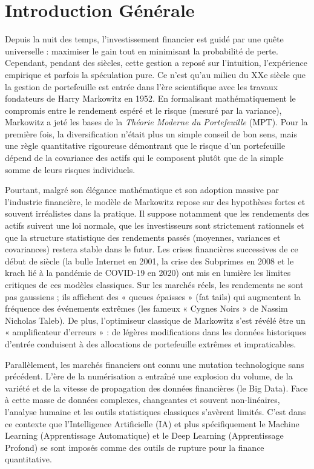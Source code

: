\chapter*{Introduction Générale}

Depuis la nuit des temps, l'investissement financier est guidé par une quête universelle : maximiser le gain tout en minimisant la probabilité de perte. Cependant, pendant des siècles, cette gestion a reposé sur l'intuition, l'expérience empirique et parfois la spéculation pure. Ce n'est qu'au milieu du XXe siècle que la gestion de portefeuille est entrée dans l'ère scientifique avec les travaux fondateurs de Harry Markowitz en 1952. En formalisant mathématiquement le compromis entre le rendement espéré et le risque (mesuré par la variance), Markowitz a jeté les bases de la \textit{Théorie Moderne du Portefeuille} (MPT). Pour la première fois, la diversification n'était plus un simple conseil de bon sens, mais une règle quantitative rigoureuse démontrant que le risque d'un portefeuille dépend de la covariance des actifs qui le composent plutôt que de la simple somme de leurs risques individuels.

Pourtant, malgré son élégance mathématique et son adoption massive par l'industrie financière, le modèle de Markowitz repose sur des hypothèses fortes et souvent irréalistes dans la pratique. Il suppose notamment que les rendements des actifs suivent une loi normale, que les investisseurs sont strictement rationnels et que la structure statistique des rendements passés (moyennes, variances et covariances) restera stable dans le futur. Les crises financières successives de ce début de siècle (la bulle Internet en 2001, la crise des Subprimes en 2008 et le krach lié à la pandémie de COVID-19 en 2020) ont mis en lumière les limites critiques de ces modèles classiques. Sur les marchés réels, les rendements ne sont pas gaussiens ; ils affichent des « queues épaisses » (fat tails) qui augmentent la fréquence des événements extrêmes (les fameux « Cygnes Noirs » de Nassim Nicholas Taleb). De plus, l'optimiseur classique de Markowitz s'est révélé être un « amplificateur d'erreurs » : de légères modifications dans les données historiques d'entrée conduisent à des allocations de portefeuille extrêmes et impraticables.

Parallèlement, les marchés financiers ont connu une mutation technologique sans précédent. L'ère de la numérisation a entraîné une explosion du volume, de la variété et de la vitesse de propagation des données financières (le Big Data). Face à cette masse de données complexes, changeantes et souvent non-linéaires, l'analyse humaine et les outils statistiques classiques s'avèrent limités. C'est dans ce contexte que l'Intelligence Artificielle (IA) et plus spécifiquement le Machine Learning (Apprentissage Automatique) et le Deep Learning (Apprentissage Profond) se sont imposés comme des outils de rupture pour la finance quantitative.

